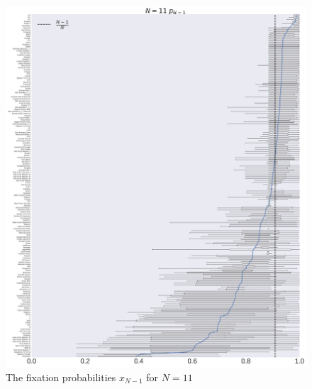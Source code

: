 \documentclass[10pt,letterpaper]{article}
\begin{document}
\begin{figure}[!hbtp]
    \centering
    \includegraphics[width=\textwidth]{./boxplot_11_resist.pdf}
    \caption{The fixation probabilities \(x_{N-1}\) for \(N=11\)}
\end{figure}
\end{document}
